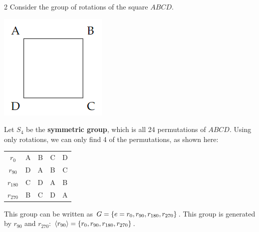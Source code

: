 \begin{example}2
    Consider the group of rotations of the square $ABCD$.
    \begin{center}
        \includegraphics[scale=1]{figures/square.png}
    \end{center} 
    Let $S_4$ be the \textbf{symmetric group}, which is all 
    24 permutations of $ABCD$. Using only rotations, we can 
    only find 4 of the permutations, as shown here: 
    \begin{center}
        \begin{tabular}{c|cccc}
            $r_0$ & A & B & C & D \\ 
            $r_{90}$ & D & A & B & C \\ 
            $r_{180}$ & C & D & A & B \\ 
            $r_{270}$ & B & C & D & A
        \end{tabular}
    \end{center}
    This group can be written as $G = \left\{e = r_0, r_{90}, r_{180}, r_{270}\right\}$. 
    This group is generated by $r_{90}$ and $r_{270}$: $\langle r_{90} \rangle =  \left\{r_0, r_{90}, r_{180}, r_{270}\right\}$.
\end{example}

